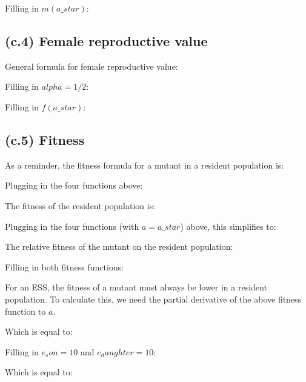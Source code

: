 \documentclass[11]{article}
\begin{document}


Filling in $m(a\_star)$:



\subsection{(c.4) Female reproductive value}

General formula for female reproductive value:



Filling in $alpha=1/2$:



Filling in $f(a\_star)$:



\subsection{(c.5) Fitness}

As a reminder, the fitness formula for a mutant in a resident population is:



Plugging in the four functions above:



The fitness of the resident population is: 



Plugging in the four functions (with $a=a\_star$) above, this simplifies to:



The relative fitness of the mutant on the resident population:



Filling in both fitness functions:



For an ESS, the fitness of a mutant must always be lower in a resident population. To calculate this, we need the partial derivative of the above fitness function to $a$.



Which is equal to:



Filling in $e_son=10$ and $e_daughter=10$:



Which is equal to:


\end{document}
